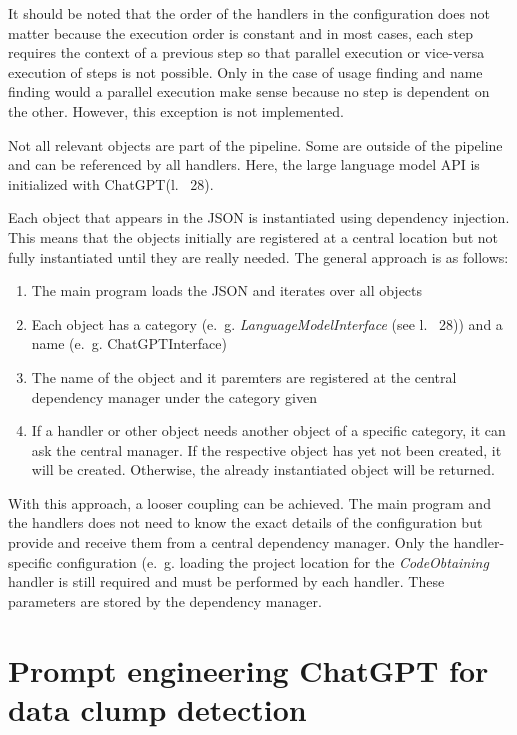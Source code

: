 It should be noted that the order of the handlers in the configuration  does not matter because the execution order is constant and in most cases, each step requires the context of a previous step so that parallel execution or vice-versa execution of steps is not possible. Only in the case of usage finding and name finding would a parallel execution make sense because no step is dependent on the other.  However, this exception is not implemented.

Not all relevant objects are part of the pipeline. Some are outside of the pipeline and can be referenced by all handlers. Here, the large language model \ac{API} is initialized with ChatGPT(l.~ 28).

Each object that appears in the \ac{JSON} is instantiated using dependency injection. This means that the objects initially are registered at a central location but not fully instantiated until they are really needed. The general approach is as follows:
\begin{enumerate}
    \item The main program loads the \ac{JSON} and iterates over all objects
    \item Each object has a category (e.~g. \textit{LanguageModelInterface} (see l.~ 28)) and a name (e.~g. ChatGPTInterface) 
    \item The name of the object and it paremters are registered at the central dependency manager under the category given
    \item If a handler or other object needs another object of a specific category, it can ask the central manager. If the respective object has  yet not been created, it will be created. Otherwise, the already instantiated object will be returned. 
\end{enumerate}
With this approach, a looser coupling can be achieved. The main program and the handlers does not need to know the exact details of the configuration but provide and receive them from a central dependency manager. Only the handler-specific configuration (e.~g. loading the project location  for the \textit{CodeObtaining} handler is still required and must be performed by each handler. These parameters are stored by the dependency manager. 


\section{Prompt engineering ChatGPT for data clump detection}\label{sec:prompt_engineering}

